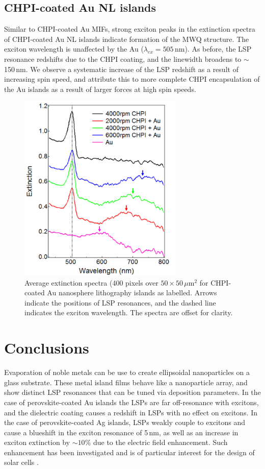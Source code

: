 \subsection{CHPI-coated Au NL islands}
Similar to CHPI-coated Au MIFs, strong exciton peaks in the extinction spectra of CHPI-coated Au NL islands indicate formation of the MWQ structure. The exciton wavelength is unaffected by the Au ($\lambda_{ex} = 505$\,nm). As before, the LSP resonance redshifts due to the CHPI coating, and the linewidth broadens to $\sim$150\,nm. We observe a systematic increase of the LSP redshift as a result of increasing spin speed, and attribute this to more complete CHPI encapsulation of the Au islands as a result of larger forces at high spin speeds.
\begin{figure}[h!] 
\centering    
\includegraphics[width=0.7\textwidth]{Fig10}
\caption{Average extinction spectra (400 pixels over $50\times50\,\mu$m$^2$ for CHPI-coated Au nanosphere lithography islands as labelled. Arrows indicate the positions of LSP resonances, and the dashed line indicates the exciton wavelength. The spectra are offset for clarity.}
\label{6Fig10}
\end{figure}

\section{Conclusions}
Evaporation of noble metals can be use to create ellipsoidal nanoparticles on a glass substrate. These metal island films behave like a nanoparticle array, and show distinct LSP resonances that can be tuned via deposition parameters. In the case of perovskite-coated Au islands the LSPs are far off-resonance with excitons, and the dielectric coating causes a redshift in LSPs with no effect on excitons. In the case of perovskite-coated Ag islands, LSPs weakly couple to excitons and cause a blueshift in the exciton resonance of 5\,nm, as well as an increase in exciton extinction by $\sim10$\% due to the electric field enhancement. Such enhancement has been investigated and is of particular interest for the design of solar cells \cite{Alemu2014, Zheng2011, Xu2013, Spinelli2012}.

